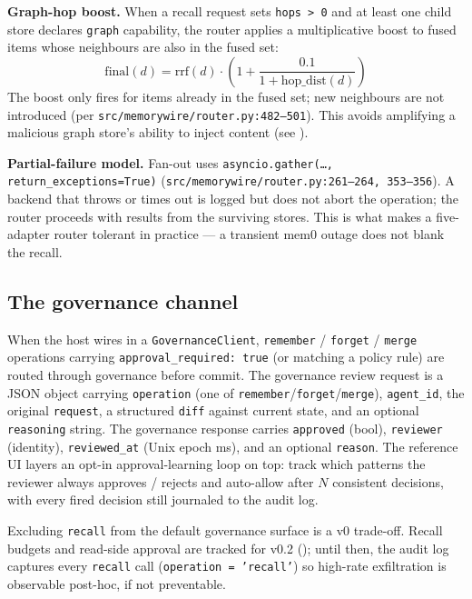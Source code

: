 \documentclass[11pt,letterpaper,twocolumn]{article}
\begin{document}
\textbf{Graph-hop boost.} When a recall request sets \texttt{hops > 0} and at least one child store declares \texttt{graph} capability, the router applies a multiplicative boost to fused items whose neighbours are also in the fused set:
\[
  \mathrm{final}(d) = \mathrm{rrf}(d) \cdot \left(1 + \frac{0.1}{1 + \mathrm{hop\_dist}(d)}\right)
\]
The boost only fires for items already in the fused set; new neighbours are not introduced (per \texttt{src/memorywire/router.py:482--501}). This avoids amplifying a malicious graph store's ability to inject content (see ).

\textbf{Partial-failure model.} Fan-out uses \texttt{asyncio.gather(\ldots, return\_exceptions=True)} (\texttt{src/memorywire/router.py:261--264, 353--356}). A backend that throws or times out is logged but does not abort the operation; the router proceeds with results from the surviving stores. This is what makes a five-adapter router tolerant in practice --- a transient mem0 outage does not blank the recall.

\subsection{The governance channel}
\label{sec:spec-governance}

When the host wires in a \texttt{GovernanceClient}, \texttt{remember} / \texttt{forget} / \texttt{merge} operations carrying \texttt{approval\_required: true} (or matching a policy rule) are routed through governance before commit. The governance review request is a JSON object carrying \texttt{operation} (one of \texttt{remember}/\texttt{forget}/\texttt{merge}), \texttt{agent\_id}, the original \texttt{request}, a structured \texttt{diff} against current state, and an optional \texttt{reasoning} string. The governance response carries \texttt{approved} (bool), \texttt{reviewer} (identity), \texttt{reviewed\_at} (Unix epoch ms), and an optional \texttt{reason}. The reference UI layers an opt-in approval-learning loop on top: track which patterns the reviewer always approves / rejects and auto-allow after $N$ consistent decisions, with every fired decision still journaled to the audit log.

Excluding \texttt{recall} from the default governance surface is a v0 trade-off. Recall budgets and read-side approval are tracked for v0.2 (); until then, the audit log captures every \texttt{recall} call (\texttt{operation = 'recall'}) so high-rate exfiltration is observable post-hoc, if not preventable.
\end{document}
